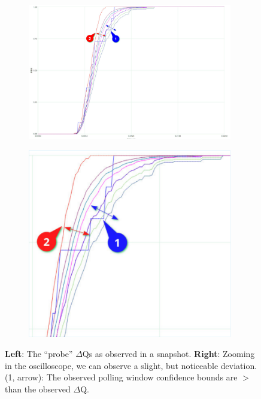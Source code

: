        \begin{figure}[H]
            \centering
            \begin{subfigure}{.5\textwidth}
                \centering
                \includegraphics[width=0.98\textwidth]{img/overload_2/150_probe2.pdf}
                \label{fig:ovuvv}
            \end{subfigure}%
            \begin{subfigure}{.5\textwidth}
                \centering
                \includegraphics[width =0.98\textwidth]{img/overload_2/150_probe2zoom_cropped.pdf}
                \label{fig:ovovv}
            \end{subfigure}
            \caption{\textbf{Left}: The ``probe'' $\Delta$Qs as observed in a snapshot. \textbf{Right}: Zooming in the oscilloscope, we can observe a slight, but noticeable deviation. (1, arrow): The observed polling window confidence bounds are $>$ than the observed $\Delta$Q.}
            \label{fig:avavv} 
        \end{figure}
       
